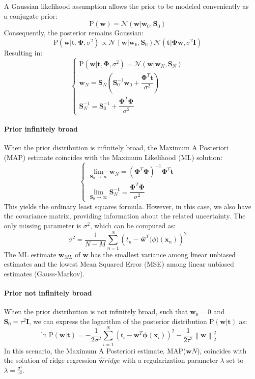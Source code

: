 A Gaussian likelihood assumption allows the prior to be modeled conveniently as a conjugate prior:
\[\text{P}(\textbf{w})=\mathcal{N}(\textbf{w}|\textbf{w}_0,\textbf{S}_0)\]
Consequently, the posterior remains Gaussian:
\[\text{P}(\textbf{w}|\textbf{t},\boldsymbol{\Phi},\sigma^2)\varpropto \mathcal{N}(\textbf{w}|\textbf{w}_0,\textbf{S}_0)\mathcal{N}(\textbf{t}|\boldsymbol{\Phi}\textbf{w},\sigma^2\textbf{I})\]
Resulting in:
\[\begin{cases}
    \text{P}(\textbf{w}|\textbf{t},\boldsymbol{\Phi},\sigma^2)=\mathcal{N}(\textbf{w}|\textbf{w}_N,\textbf{S}_N) \\
    \textbf{w}_N=\textbf{S}_N\left(\textbf{S}_0^{-1}\textbf{w}_0+\dfrac{\boldsymbol{\Phi}^T\textbf{t}}{\sigma^2}\right) \\
    \textbf{S}_N^{-1}=\textbf{S}_0^{-1}+\dfrac{\boldsymbol{\Phi}^T\boldsymbol{\Phi}}{\sigma^2}
\end{cases}\]

\paragraph*{Prior infinitely broad}
When the prior distribution is infinitely broad, the Maximum A Posteriori (MAP) estimate coincides with the Maximum Likelihood (ML) solution:
\[\begin{cases}
    \lim_{\textbf{S}_0\rightarrow\infty}\textbf{w}_N=\left( \boldsymbol{\Phi}^T\boldsymbol{\Phi} \right)^{-1}\boldsymbol{\Phi}^T\textbf{t} \\
    \lim_{\textbf{S}_0\rightarrow\infty}\textbf{S}_N^{-1}=\dfrac{\boldsymbol{\Phi}^T\boldsymbol{\Phi}}{\sigma^2}
\end{cases}\]
This yields the ordinary least squares formula.
However, in this case, we also have the covariance matrix, providing information about the related uncertainty.
The only missing parameter is $\sigma^2$, which can be computed as:
\[\sigma^2=\dfrac{1}{N-M}\sum_{n=1}^{N}\left( t_n-\hat{\textbf{w}}^T\boldsymbol(\phi)(\textbf{x}_n) \right)^2\]
The ML estimate $\textbf{w}_{ML}$ of $\textbf{w}$ has the smallest variance among linear unbiased estimates and the lowest Mean Squared Error (MSE) among linear unbiased estimates (Gauss-Markov).

\paragraph*{Prior not infinitely broad}
When the prior distribution is not infinitely broad, such that $\textbf{w}_0=0$ and $\textbf{S}_0=\tau^2\textbf{I}$, we can express the logarithm of the posterior distribution $\text{P}(\textbf{w}|\textbf{t})$ as:
\[\ln\text{P}(\textbf{w}|\textbf{t})=-\dfrac{1}{2\sigma^2}\sum_{i=1}^{N}\left(t_i-\textbf{w}^T\boldsymbol{\phi}(\textbf{x}_i)\right)^2-\dfrac{1}{2\tau^2}\left\lVert \textbf{w}\right\rVert_2^2 \]
In this scenario, the Maximum A Posteriori estimate, MAP($\textbf{w}N$), coincides with the solution of ridge regression $\hat{\textbf{w}}{ridge}$ with a regularization parameter $\lambda$ set to $\lambda=\frac{\sigma^2}{\tau^2}$.

